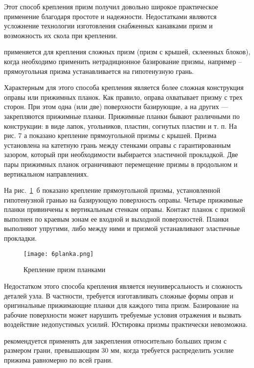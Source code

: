 Этот способ крепления призм получил довольно широкое практическое применение благодаря простоте и надежности. Недостатками являются усложнение технологии изготовления снабженных канавками призм и возможность их скола при креплении.

  применяется для крепления сложных призм (призм с крышей, склеенных блоков), когда необходимо применить нетрадиционное базирование призмы, например -- прямоугольная призма устанавливается на гипотенузную грань.

Характерным для этого способа крепления является более сложная конструкция оправы или прижимных планок. Как правило, оправа охватывает призму с трех сторон. При этом одна (или две) поверхности базирующие, а на других --- закрепляются прижимные планки. Прижимные планки бывают различными по конструкции: в виде лапок, угольников, пластин, согнутых пластин и т. п. На рис. 7 а показано крепление прямоугольной призмы с крышей. Призма установлена на катетную грань между стенками оправы с гарантированным зазором, который при необходимости выбирается эластичной прокладкой. Две пары прижимных планок ограничивают перемещение призмы в продольном и вертикальном направлениях.

На рис.~\ref{pic:6planka}~б показано крепление прямоугольной призмы, установленной гипотенузной гранью на базирующую поверхность оправы. Четыре прижимные планки привинчены к вертикальным стенкам оправы. Контакт планок с призмой выполнен по краевым зонам ее входной и выходной поверхностей. Планки выполняют упругими, либо между ними и призмой устанавливают эластичные прокладки.

\begin{figure}[h!]
	\texttt{[image: 6planka.png]}
	\caption{ Крепление призм  планками }
	\label{pic:6planka}
\end{figure}

Недостатком этого способа крепления является неуниверсальность и сложность деталей узла. В частности, требуется изготавливать сложные формы оправ и оригинальные прижимающие планки для каждого типа призм. Базирование на рабочие поверхности может нарушить требуемые условия отражения и вызвать воздействие недопустимых усилий. Юстировка призмы практически невозможна.

  рекомендуется применять для закрепления относительно больших призм с размером грани, превышающим 30 мм, когда требуется распределить усилие прижима равномерно по всей грани.

